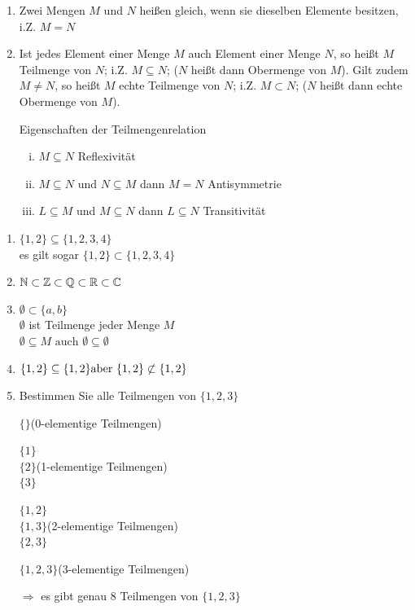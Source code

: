 \Def
\begin{enumerate}
	\item Zwei Mengen $M$ und $N$ heißen gleich, wenn sie dieselben Elemente besitzen, i.Z. $M=N$
	
	\item Ist jedes Element einer Menge $M$ auch Element einer Menge $N$, so heißt $M$ Teilmenge von $N$; i.Z. $M\subseteq N$; ($N$ heißt dann Obermenge von $M$). Gilt zudem $M\ne N$, so heißt $M$ echte Teilmenge von $N$; i.Z. $M\subset N$; ($N$ heißt dann echte Obermenge von $M$).
	
	Eigenschaften der Teilmengenrelation
	\begin{enumerate}[i)]
		\item $M\subseteq N$
		\hfill Reflexivität
		\item $M\subseteq N$ und $N\subseteq M$ dann $M=N$
		\hfill Antisymmetrie
		\item $L\subseteq M$ und $M\subseteq N$ dann $L\subseteq N$
		\hfill Transitivität
	\end{enumerate}
\end{enumerate}

\Bsps
\begin{enumerate}
	\item $\{1,2\} \subseteq \{1,2,3,4\}$\\
	es gilt sogar $\{1,2\} \subset \{1,2,3,4\}$
	
	\item $\mathbb{N}\subset\mathbb{Z}\subset\mathbb{Q}\subset\mathbb{R}\subset\mathbb{C}$
	
	\item $\emptyset \subset \{a,b\}$\\
	$\emptyset$ ist Teilmenge jeder Menge $M$\\
	$\emptyset \subseteq M\text{ auch }\emptyset \subseteq \emptyset$
	
	\item $\{1,2\}\subseteq\{1,2\}\\
	\text{aber }\{1,2\} \not\subset \{1,2\}$
	
	\item Bestimmen Sie alle Teilmengen von $\{1,2,3\}$
	
	$\{\}$\hfill(0-elementige Teilmengen)
	
	$\{1\}$\\
	$\{2\}$\hfill(1-elementige Teilmengen)\\
	$\{3\}$
	
	$\{1,2\}$\\
	$\{1,3\}$\hfill(2-elementige Teilmengen)\\
	$\{2,3\}$
	
	$\{1,2,3\}$\hfill(3-elementige Teilmengen)
	
	$\Rightarrow$ es gibt genau 8 Teilmengen von $\{1,2,3\}$
\end{enumerate}

